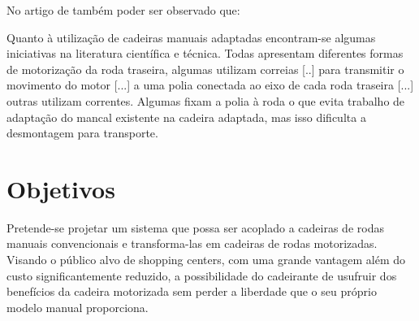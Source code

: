 No artigo de \cite{artigo_rudi} também poder ser observado que:
\begin{citacao}
Quanto à utilização de cadeiras manuais adaptadas encontram-se algumas iniciativas na literatura científica e técnica. Todas apresentam diferentes formas de motorização da roda traseira, algumas utilizam correias [..] para
transmitir o movimento do motor [...] a uma polia conectada ao eixo de cada roda traseira [...] outras utilizam
correntes. Algumas fixam a polia à roda o que evita trabalho de adaptação do mancal existente na cadeira adaptada, mas isso dificulta a desmontagem para transporte.
\end{citacao}


\section{Objetivos}

Pretende-se projetar um sistema que possa ser acoplado a cadeiras de rodas manuais convencionais e transforma-las em cadeiras de rodas motorizadas. Visando o público alvo de shopping centers, com uma grande vantagem além do custo significantemente reduzido, a possibilidade do cadeirante de usufruir dos benefícios da cadeira motorizada sem perder a liberdade que o seu próprio modelo manual proporciona.
